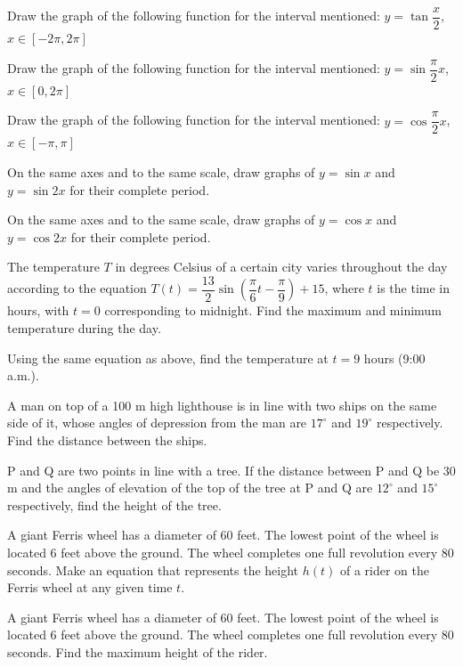 \documentclass[11pt,a4paper]{article}
\begin{document}
\begin{longlist}
\item Draw the graph of the following function for the interval mentioned: $y=\tan\dfrac{x}{2}$, $x\in[-2\pi,2\pi]$

\item Draw the graph of the following function for the interval mentioned: $y=\sin\dfrac{\pi}{2}x$, $x\in[0,2\pi]$

\item Draw the graph of the following function for the interval mentioned: $y=\cos\dfrac{\pi}{2}x$, $x\in[-\pi,\pi]$

\item On the same axes and to the same scale, draw graphs of $y=\sin x$ and $y=\sin2x$ for their complete period.

\item On the same axes and to the same scale, draw graphs of $y=\cos x$ and $y=\cos2x$ for their complete period.

\item The temperature $T$ in degrees Celsius of a certain city varies throughout the day according to the equation $T(t)=\dfrac{13}{2}\sin\left(\dfrac{\pi}{6}t-\dfrac{\pi}{9}\right)+15$, where $t$ is the time in hours, with $t=0$ corresponding to midnight. Find the maximum and minimum temperature during the day.

\item Using the same equation as above, find the temperature at $t=9$ hours (9:00 a.m.).

\item A man on top of a 100 m high lighthouse is in line with two ships on the same side of it, whose angles of depression from the man are $17^\circ$ and $19^\circ$ respectively. Find the distance between the ships.

\item P and Q are two points in line with a tree. If the distance between P and Q be 30 m and the angles of elevation of the top of the tree at P and Q are $12^\circ$ and $15^\circ$ respectively, find the height of the tree.

\item A giant Ferris wheel has a diameter of 60 feet. The lowest point of the wheel is located 6 feet above the ground. The wheel completes one full revolution every 80 seconds. Make an equation that represents the height $h(t)$ of a rider on the Ferris wheel at any given time $t$.

\item A giant Ferris wheel has a diameter of 60 feet. The lowest point of the wheel is located 6 feet above the ground. The wheel completes one full revolution every 80 seconds. Find the maximum height of the rider.


\end{longlist}
\end{document}
